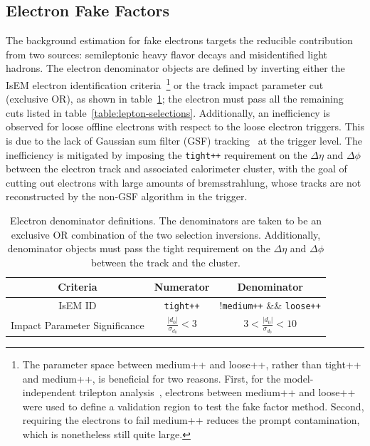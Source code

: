 \subsection{Electron Fake Factors}\label{sec:electron-fake-factors}
The background estimation for fake electrons targets the reducible contribution from two sources: semileptonic heavy flavor decays and misidentified light hadrons. The electron denominator objects are defined by inverting either the IsEM electron identification criteria~\footnote{The parameter space between medium++ and loose++, rather than tight++ and medium++, is beneficial for two reasons. First, for the model-independent trilepton analysis~\cite{DeViveiros:1670929}, electrons between medium++ and loose++ were used to define a validation region to test the fake factor method. Second, requiring the electrons to fail medium++ reduces the prompt contamination, which is nonetheless still quite large.} or the track impact parameter cut (exclusive OR), as shown in table~\ref{table:electron-denominator-definition}; the electron must pass all the remaining cuts listed in table~\ref{table:lepton-selections}. Additionally, an inefficiency is observed for loose offline electrons with respect to the loose electron triggers. This is due to the lack of Gaussian sum filter (GSF) tracking~\cite{ATLAS-CONF-2012-047} at the trigger level. The inefficiency is mitigated by imposing the \verb.tight++. requirement on the $\Delta\eta$ and $\Delta\phi$ between the electron track and associated calorimeter cluster, with the goal of cutting out electrons with large amounts of bremsstrahlung, whose tracks are not reconstructed by the non-GSF algorithm in the trigger. 


\begin{table}[h]
  \centering
  \begin{tabular}{ccc}
	\hline
	Criteria & Numerator & Denominator \\ \hline
	IsEM ID & \verb.tight++. & !\verb.medium++. \&\& \verb.loose++.  \\
	Impact Parameter Significance & $\frac{|d_0|}{\sigma_{d_0}} < 3$ & $3 < \frac{|d_0|}{\sigma_{d_0}} < 10$ \\
	\hline
  \end{tabular}
  \caption{Electron denominator definitions. The denominators are taken to be an exclusive OR combination of the two selection inversions. Additionally, denominator objects must pass the tight requirement on the $\Delta\eta$ and $\Delta\phi$ between the track and the cluster.}
  \label{table:electron-denominator-definition}
\end{table}

